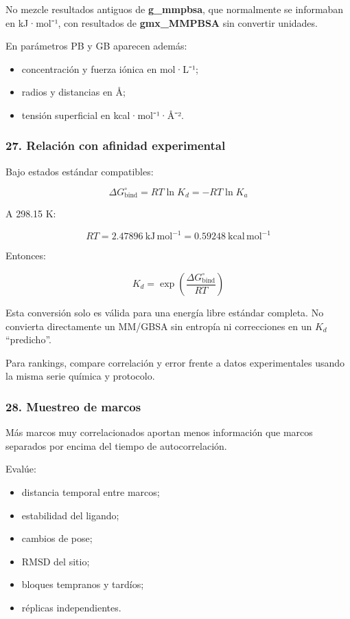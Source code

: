 \documentclass[
  spanish,
  11pt,
  a4paper]{article}
\providecommand{\tightlist}{%
  \setlength{\itemsep}{0pt}\setlength{\parskip}{0pt}}
\begin{document}
No mezcle resultados antiguos de \textbf{g\_mmpbsa}, que normalmente se
informaban en kJ·mol⁻¹, con resultados de \textbf{gmx\_MMPBSA} sin
convertir unidades.

En parámetros PB y GB aparecen además:

\begin{itemize}
\tightlist
\item
  concentración y fuerza iónica en mol·L⁻¹;
\item
  radios y distancias en Å;
\item
  tensión superficial en kcal·mol⁻¹·Å⁻².
\end{itemize}

\subsubsection{27. Relación con afinidad
experimental}\label{relaciuxf3n-con-afinidad-experimental}

Bajo estados estándar compatibles:

\[
\Delta G^\circ_{\mathrm{bind}}
=
RT\ln K_d
=
-RT\ln K_a
\]

A 298.15 K:

\[
RT=2.47896\ \mathrm{kJ\,mol^{-1}}
=0.59248\ \mathrm{kcal\,mol^{-1}}
\]

Entonces:

\[
K_d=
\exp
\left(
\frac{\Delta G^\circ_{\mathrm{bind}}}{RT}
\right)
\]

Esta conversión solo es válida para una energía libre estándar completa.
No convierta directamente un MM/GBSA sin entropía ni correcciones en un
\(K_d\) ``predicho''.

Para rankings, compare correlación y error frente a datos experimentales
usando la misma serie química y protocolo.

\subsubsection{28. Muestreo de marcos}\label{muestreo-de-marcos}

Más marcos muy correlacionados aportan menos información que marcos
separados por encima del tiempo de autocorrelación.

Evalúe:

\begin{itemize}
\tightlist
\item
  distancia temporal entre marcos;
\item
  estabilidad del ligando;
\item
  cambios de pose;
\item
  RMSD del sitio;
\item
  bloques tempranos y tardíos;
\item
  réplicas independientes.
\end{itemize}
\end{document}
